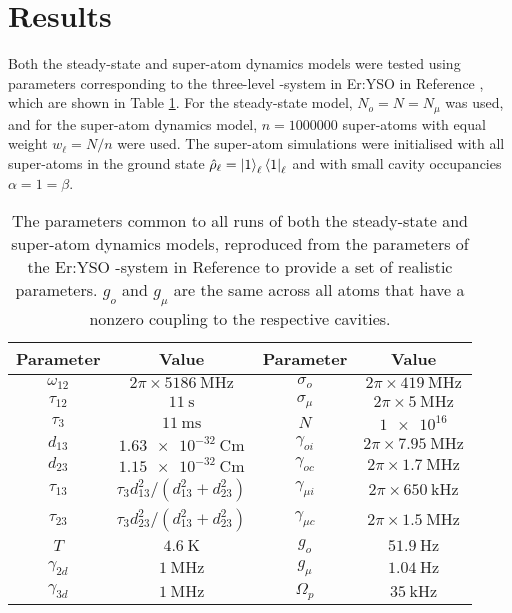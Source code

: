 \section{\label{sec:biphoton_results}Results}
Both the steady-state and super-atom dynamics models were tested using parameters corresponding to the three-level \textLambda-system in Er:YSO in Reference \cite{barnett_longdell_2020}, which are shown in Table \ref{tab:biphoton_parameters}. For the steady-state model, $N_o = N = N_\mu$ was used, and for the super-atom dynamics model, $n=\num{1000000}$ super-atoms with equal weight $w_\ell = N/n$ were used. The super-atom simulations were initialised with all super-atoms in the ground state $\hat{\rho}_\ell = \left|1\right\rangle_\ell\left\langle1\right|_\ell$ and with small cavity occupancies $\alpha = 1 = \beta$.

\begin{table}[ht]
\centering
\begin{tabular}{c|c||c|c}
Parameter & Value & Parameter & Value\\
\hline
$\omega_{12}$    & $2\pi \times \qty{5186}{\mega\hertz}$ & $\sigma_o$       & $2\pi \times \qty{419}{\mega\hertz}$ \\
$\tau_{12}$      & $\qty{11}{\second}$                   & $\sigma_\mu$     & $2\pi \times \qty{5}{\mega\hertz}$   \\
$\tau_{3}$       & $\qty{11}{\milli\second}$             & $N$              & $\num{1e16}$                         \\
$d_{13}$         & $\qty{1.63e-32}{\coulomb\metre}$      & $\gamma_{oi}$    & $2\pi \times \qty{7.95}{\mega\hertz}$\\
$d_{23}$         & $\qty{1.15e-32}{\coulomb\metre}$      & $\gamma_{oc}$    & $2\pi \times \qty{1.7}{\mega\hertz}$ \\
$\tau_{13}$      & $\tau_3d_{13}^2/(d_{13}^2+d_{23}^2)$  & $\gamma_{\mu i}$ & $2\pi \times \qty{650}{\kilo\hertz}$ \\
$\tau_{23}$      & $\tau_3d_{23}^2/(d_{13}^2+d_{23}^2)$  & $\gamma_{\mu c}$ & $2\pi \times \qty{1.5}{\mega\hertz}$ \\
$T$              & $\qty{4.6}{\kelvin}$                  & $g_o$            & $\qty{51.9}{\hertz}$                 \\
$\gamma_{2d}$    & $\qty{1}{\mega\hertz}$                & $g_\mu$          & $\qty{1.04}{\hertz}$                 \\
$\gamma_{3d}$    & $\qty{1}{\mega\hertz}$                & $\Omega_p$       & $\qty{35}{\kilo\hertz}$              \\
\end{tabular}
\caption{\label{tab:biphoton_parameters} The parameters common to all runs of both the steady-state and super-atom dynamics models, reproduced from the parameters of the Er:YSO \textLambda-system in Reference \cite{barnett_longdell_2020} to provide a set of realistic parameters. $g_o$ and $g_\mu$ are the same across all atoms that have a nonzero coupling to the respective cavities.}
\end{table}

